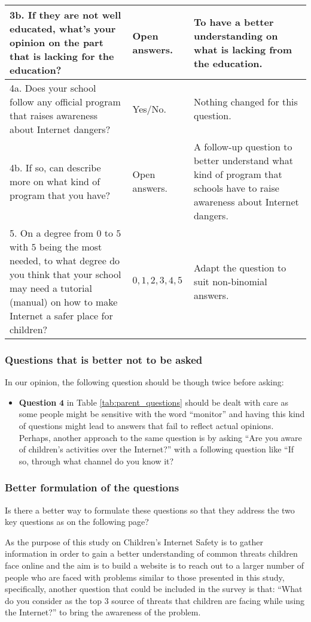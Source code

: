 \documentclass[a4paper,11pt]{article}
\begin{document}
\begin{table}
{\begin{tabular}{|p{6cm}|p{3cm}|p{6cm}|}
    \\ \hline
    3b. If they are not well educated, what's your opinion on the part that is lacking for the education?   & Open answers.    & To have a better understanding on what is lacking from the education.
    \\ \hline
    4a. Does your school follow any official program that raises awareness about Internet dangers?      & Yes/No.    & Nothing changed for this question.
    \\ \hline
    4b. If so, can describe more on what kind of program that you have?     & Open answers.     & A follow-up question to better understand what kind of program that schools have to raise awareness about Internet dangers.
    \\ \hline
    5. On a degree from $0$ to $5$ with $5$ being the most needed, to what degree do you think that your school may need a tutorial (manual) on how to make Internet a safer place for children?  &  $0, 1, 2, 3, 4, 5$  & Adapt the question to suit non-binomial answers.
    \\ \hline
    \end{tabular}%
    }
\end{table}


\subsubsection*{Questions that is better not to be asked}
In our opinion, the following question should be though twice before asking:
\begin{itemize}
    \item \textbf{Question} $\mathbf{4}$ in Table \ref{tab:parent_questions} should be dealt with care as some people might be sensitive with the word ``monitor'' and having this kind of questions might lead to answers that fail to reflect actual opinions. Perhaps, another approach to the same question is by asking ``Are you aware of children's activities over the Internet?'' with a following question like ``If so, through what channel do you know it?
\end{itemize}


\subsubsection*{Better formulation of the questions}
Is there a better way to formulate these questions so that they address the two key questions as on the following page?


As the purpose of this study on Children’s Internet Safety is to gather information in order to gain a better understanding of common threats children face online and the aim is to build a website is to reach out to a larger number of people who are faced with problems similar to those presented in this study, specifically, another question that could be included in the survey is that: ``What do you consider as the top $3$ source of threats that children are facing while using the Internet?'' to bring the awareness of the problem.
\end{document}
